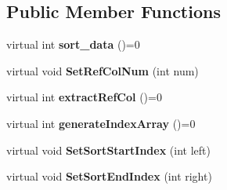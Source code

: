 \subsection*{Public Member Functions}
\begin{DoxyCompactItemize}
\item 
\hypertarget{classsorting_a94c4b729732743299f3dcd2505312381}{
virtual int {\bfseries sort\_\-data} ()=0}
\label{df/d42/classsorting_a94c4b729732743299f3dcd2505312381}

\item 
\hypertarget{classsorting_aee6e7f2f0ea31873c500e0692e4fc00c}{
virtual void {\bfseries SetRefColNum} (int num)}
\label{df/d42/classsorting_aee6e7f2f0ea31873c500e0692e4fc00c}

\item 
\hypertarget{classsorting_aff9dd3c8504d079766750c6691389b40}{
virtual int {\bfseries extractRefCol} ()=0}
\label{df/d42/classsorting_aff9dd3c8504d079766750c6691389b40}

\item 
\hypertarget{classsorting_a2d915b596fa54646dc745a09a2ce0af6}{
virtual int {\bfseries generateIndexArray} ()=0}
\label{df/d42/classsorting_a2d915b596fa54646dc745a09a2ce0af6}

\item 
\hypertarget{classsorting_a09a4d9826da05fca7cea98ad96f2a856}{
virtual void {\bfseries SetSortStartIndex} (int left)}
\label{df/d42/classsorting_a09a4d9826da05fca7cea98ad96f2a856}

\item 
\hypertarget{classsorting_aa0ddc9bd7ca5f6db668911088b4cb9a0}{
virtual void {\bfseries SetSortEndIndex} (int right)}
\label{df/d42/classsorting_aa0ddc9bd7ca5f6db668911088b4cb9a0}

\end{DoxyCompactItemize}
